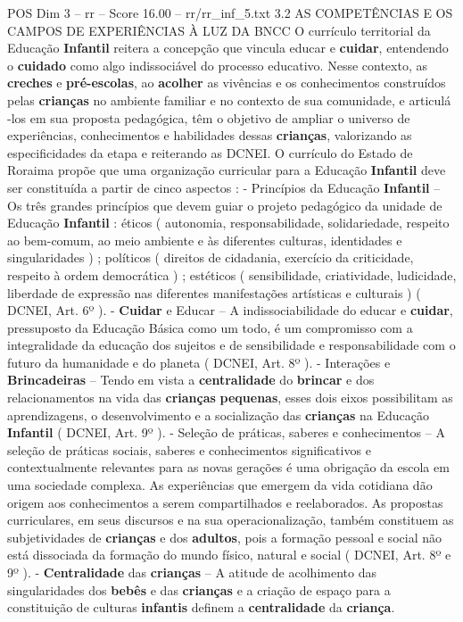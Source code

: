 \begin{textsample}{POS Dim 3 – rr – Score 16.00 – rr/rr\_inf\_5.txt}  \label{ex:f3_pos_225}
3.2 AS COMPETÊNCIAS E OS CAMPOS DE EXPERIÊNCIAS À LUZ DA BNCC O currículo territorial da Educação \textbf{Infantil} reitera a concepção que vincula educar e \textbf{cuidar}, entendendo o \textbf{cuidado} como algo indissociável do processo educativo.
Nesse contexto, as \textbf{creches} e \textbf{pré-escolas}, ao \textbf{acolher} as vivências e os conhecimentos construídos pelas \textbf{crianças} no ambiente familiar e no contexto de sua comunidade, e articulá -los em sua proposta pedagógica, têm o objetivo de ampliar o universo de experiências, conhecimentos e habilidades dessas \textbf{crianças}, valorizando as especificidades da etapa e reiterando as DCNEI.
O currículo do Estado de Roraima propõe que uma organização curricular para a Educação \textbf{Infantil} deve ser constituída a partir de cinco aspectos : - Princípios da Educação \textbf{Infantil} – Os três grandes princípios que devem guiar o projeto pedagógico da unidade de Educação \textbf{Infantil} : éticos ( autonomia, responsabilidade, solidariedade, respeito ao bem-comum, ao meio ambiente e às diferentes culturas, identidades e singularidades ) ; políticos ( direitos de cidadania, exercício da criticidade, respeito à ordem democrática ) ; estéticos ( sensibilidade, criatividade, ludicidade, liberdade de expressão nas diferentes manifestações artísticas e culturais ) ( DCNEI, Art. 6º ). - \textbf{Cuidar} e Educar – A indissociabilidade do educar e \textbf{cuidar}, pressuposto da Educação Básica como um todo, é um compromisso com a integralidade da educação dos sujeitos e de sensibilidade e responsabilidade com o futuro da humanidade e do planeta ( DCNEI, Art. 8º ). - Interações e \textbf{Brincadeiras} – Tendo em vista a \textbf{centralidade} do \textbf{brincar} e dos relacionamentos na vida das \textbf{crianças} \textbf{pequenas}, esses dois eixos possibilitam as aprendizagens, o desenvolvimento e a socialização das \textbf{crianças} na Educação \textbf{Infantil} ( DCNEI, Art. 9º ). - Seleção de práticas, saberes e conhecimentos – A seleção de práticas sociais, saberes e conhecimentos significativos e contextualmente relevantes para as novas gerações é uma obrigação da escola em uma sociedade complexa.
As experiências que emergem da vida cotidiana dão origem aos conhecimentos a serem compartilhados e reelaborados.
As propostas curriculares, em seus discursos e na sua operacionalização, também constituem as subjetividades de \textbf{crianças} e dos \textbf{adultos}, pois a formação pessoal e social não está dissociada da formação do mundo físico, natural e social ( DCNEI, Art. 8º e 9º ). - \textbf{Centralidade} das \textbf{crianças} – A atitude de acolhimento das singularidades dos \textbf{bebês} e das \textbf{crianças} e a criação de espaço para a constituição de culturas \textbf{infantis} definem a \textbf{centralidade} da \textbf{criança}.

\end{textsample}
